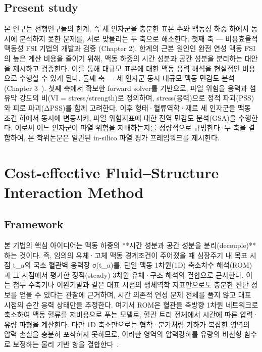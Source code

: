 \documentclass[master,english,final]{kaist-ucs}
\begin{document}
\section{Present study}
본 연구는 선행연구들의 한계, 즉 세 인자군을 충분한 표본 수와 맥동성 하중 하에서 동시에 분석하지 못한 문제를, 서로 맞물리는 두 축으로 해소한다.
첫째 축 — 비용효율적 맥동성 FSI 기법의 개발과 검증 (Chapter 2). 
한계의 근본 원인인 완전 연성 맥동 FSI의 높은 계산 비용을 줄이기 위해, 맥동 하중의 시간 성분과 공간 성분을 분리하는 대안을 제시하고 검증한다. 이를 통해 대규모 표본에 대한 맥동 응력 해석을 현실적인 비용으로 수행할 수 있게 된다.
둘째 축 — 세 인자군 동시 대규모 맥동 민감도 분석 (Chapter 3~). 
첫째 축에서 확보한 forward solver를 기반으로, 파열 위험을 응력과 섬유막 강도의 비(VI = stress/strength)로 정의하며, stress(응력)으로 정적 파괴(PSS)와 피로 파괴(ΔPSS)를 함께 고려한다. 이후 형태·혈류역학·재료 세 인자군을 맥동 조건 하에서 동시에 변동시켜, 파열 위험지표에 대한 전역 민감도 분석(GSA)을 수행한다. 이로써 어느 인자군이 파열 위험을 지배하는지를 정량적으로 규명한다. 
두 축을 결합하여, 본 학위논문은 일관된 in-silico 파열 평가 프레임워크를 제시한다.



\chapter{Cost-effective Fluid--Structure Interaction Method}

\section{Framework}
본 기법의 핵심 아이디어는 맥동 하중의 **시간 성분과 공간 성분을 분리(decouple)**하는 것이다. 즉, 임의의 유체·고체 맥동 경계조건이 주어졌을 때 심장주기 내 목표 시점 t_a의 국소 혈관벽 응력장 σ(t_a)를, 단일 맥동 1차원(1D) 축소차수 해석(ROM)과 그 시점에서 평가한 정적(steady) 3차원 유체·구조 해석의 결합으로 근사한다. 이는 첨두 수축기나 이완기말과 같은 대표 시점의 생체역학 지표만으로도 충분한 진단 정보를 얻을 수 있다는 관찰에 근거하며, 시간 의존적 연성 문제 전체를 풀지 않고 대표 시점의 순간 응력 상태만을 추정한다.
여기서 ROM은 혈관을 축방향 1차원 네트워크로 축소하여 맥동 혈류를 저비용으로 푸는 모델로, 혈관 트리 전체에서 시간에 따른 압력·유량 파형을 계산한다. 다만 1D 축소만으로는 협착·분기처럼 기하가 복잡한 영역의 압력 손실을 충분히 포착하지 못하므로, 이러한 영역의 압력강하를 유량의 비선형 함수로 보정하는 물리 기반 항을 결합한다~\cite{choi2025rom}.
\end{document}
